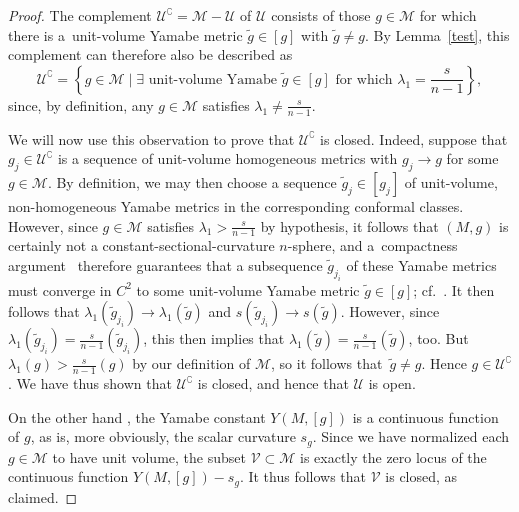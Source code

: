 \documentclass[10pt,a4paper]{amsart}
\numberwithin{equation}{section}
\begin{document}
\begin{proof} The complement $\mathscr{U}^\complement = \mathscr{M} -\mathscr{U}$ of $\mathscr{U}$ consists
of those $g\in \mathscr{M}$ for which there is a~unit-volume Yamabe metric $\tilde{g}\in [g]$ with $\tilde{g}\neq g$.
By Lemma~\ref{test}, this complement can therefore also be described as
\begin{equation*}
\mathscr{U}^\complement =\left\{ g\in \mathscr{M} \mid \exists \text{ unit-volume Yamabe $\tilde{g}\in [g]$ for which } \lambda_1 = \frac{s}{n-1}\right\},
\end{equation*}
since, by definition, any $g\in \mathscr{M}$ satisfies $\lambda_1 \neq \frac{s}{n-1}$.

We will now use this observation to prove that $\mathscr{U}^\complement$ is closed. Indeed, suppose that $g_j\in \mathscr{U}^\complement$
is a sequence of unit-volume homogeneous metrics with $g_j \to g$ for some $g\in \mathscr{M}$.
By definition, we may then choose a sequence $\tilde{g}_j\in [g_j]$ of unit-volume, non-homogeneous
 Yamabe metrics in the corresponding conformal classes.
However, since $g\in\mathscr{M}$ satisfies $\lambda_1 > \frac{s}{n-1}$ by hypothesis, it follows that
$(M,g)$ is certainly not a constant-sectional-curvature $n$-sphere, and a~compactness argument~\cite[p.~716]{bwz}
therefore guarantees that a subsequence
$\tilde{g}_{j_i}$ of these Yamabe metrics must converge in $C^{2}$ to some unit-volume Yamabe metric $\tilde{g}\in [g]$; cf.\ \cite[Proposition~2.1]{sch}.
It then follows that $\lambda_1 (\tilde{g}_{j_i}) \to \lambda_1 (\tilde{g})$ and $s(\tilde{g}_{j_i})\to s(\tilde{g})$.
However, since $\lambda_1 (\tilde{g}_{j_i}) = \frac{s}{n-1}(\tilde{g}_{j_i})$, this then implies that $\lambda_1 (\tilde{g})= \frac{s}{n-1} (\tilde{g})$,
 too. But $\lambda_1 ({g})> \frac{s}{n-1} (g)$ by our definition of $\mathscr{M}$, so it follows that~$\tilde{g}\neq g$. Hence
 $g\in \mathscr{U}^\complement$. We have
thus shown that $\mathscr{U}^\complement$ is closed, and hence that $\mathscr{U}$ is open.

On the other hand \cite[Proposition~4.31]{bes}, the Yamabe constant $Y(M, [g])$ is a continuous function of $g$, as is, more obviously, the scalar curvature $s_g$. Since we have
normalized each $g\in \mathscr{M}$ to have unit volume, the subset $\mathscr{V}\subset \mathscr{M}$ is exactly
the zero locus of the continuous function $Y(M, [g])-s_g$. It thus follows that $\mathscr{V}$ is closed, as claimed.
\end{proof}
\end{document}
